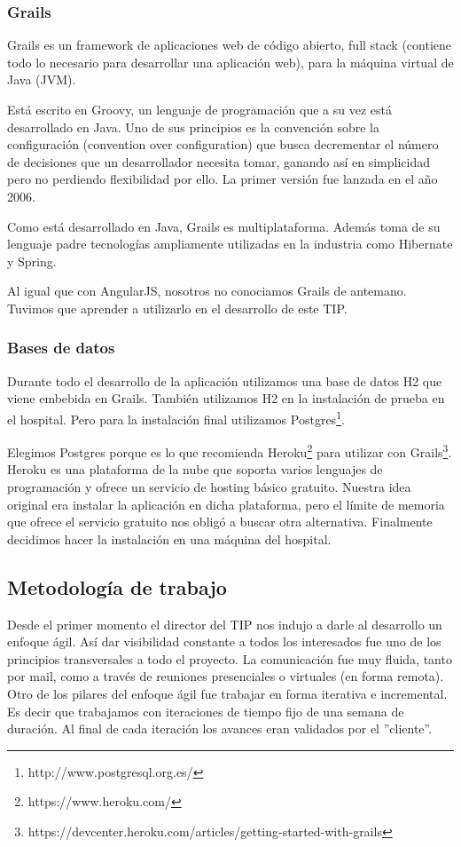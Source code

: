 \subsubsection{Grails}
Grails es un framework de aplicaciones web de código abierto, full stack (contiene todo lo necesario para desarrollar una aplicación web), para la máquina virtual de Java (JVM).

Está escrito en Groovy, un lenguaje de programación que a su vez está desarrollado en Java. Uno de sus principios es la convención sobre la configuración (convention over configuration) que busca decrementar el número de decisiones que un desarrollador necesita tomar, ganando así en simplicidad pero no perdiendo flexibilidad por ello. La primer versión fue lanzada en el año 2006.

Como está desarrollado en Java, Grails es multiplataforma. Además toma de su lenguaje padre tecnologías ampliamente utilizadas en la industria como Hibernate y Spring.

Al igual que con AngularJS, nosotros no conociamos Grails de antemano. Tuvimos que aprender a utilizarlo en el desarrollo de este TIP.

\subsubsection{Bases de datos}
Durante todo el desarrollo de la aplicación utilizamos una base de datos H2 que viene embebida en Grails. También utilizamos H2 en la instalación de prueba en el hospital. Pero para la instalación final utilizamos Postgres\footnote{http://www.postgresql.org.es/}.

Elegimos Postgres porque es lo que recomienda Heroku\footnote{https://www.heroku.com/} para utilizar con Grails\footnote{https://devcenter.heroku.com/articles/getting-started-with-grails}. Heroku es una plataforma de la nube que soporta varios lenguajes de programación y ofrece un servicio de hosting básico gratuito. Nuestra idea original era instalar la aplicación en dicha plataforma, pero el límite de memoria que ofrece el servicio gratuito nos obligó a buscar otra alternativa. Finalmente decidimos hacer la instalación en una máquina del hospital.

\subsection{Metodología de trabajo}
Desde el primer momento el director del TIP nos indujo a darle al desarrollo un enfoque ágil\cite{Shore}. Así dar visibilidad constante a todos los interesados fue uno de los principios transversales a todo el proyecto. La comunicación fue muy fluida, tanto por mail, como a través de reuniones presenciales o virtuales (en forma remota). Otro de los pilares del enfoque ágil fue trabajar en forma iterativa e incremental. Es decir que trabajamos con iteraciones de tiempo fijo de una semana de duración. Al final de cada iteración los avances eran validados por el ''cliente''.

